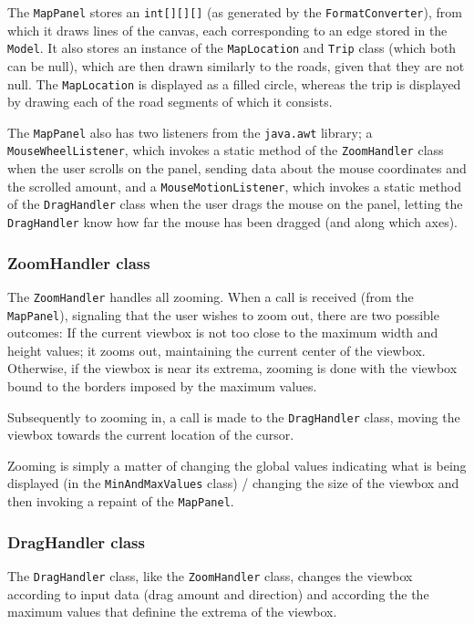 \documentclass[a4paper,11pt]{article}
\begin{document}
The \texttt{MapPanel} stores an \texttt{int[][][]} (as generated by the \texttt{FormatConverter}), from which it draws lines of the canvas, each corresponding to an edge stored in the \texttt{Model}. It also stores an instance of the \texttt{MapLocation} and \texttt{Trip} class (which both can be null), which are then drawn similarly to the roads, given that they are not null. The \texttt{MapLocation} is displayed as a filled circle, whereas the trip is displayed by drawing each of the road segments of which it consists.

The \texttt{MapPanel} also has two listeners from the \texttt{java.awt} library; a \\\texttt{MouseWheelListener}, which invokes a static method of the \texttt{ZoomHandler} class when the user scrolls on the panel, sending data about the mouse coordinates and the scrolled amount, and a \texttt{MouseMotionListener}, which invokes a static method of the \texttt{DragHandler} class when the user drags the mouse on the panel, letting the \texttt{DragHandler} know how far the mouse has been dragged (and along which axes).

\subsubsection{ZoomHandler class} %
The \texttt{ZoomHandler} handles all zooming. When a call is received (from the \texttt{MapPanel}), signaling that the user wishes to zoom out, there are two possible outcomes: If the current viewbox is not too close to the maximum width and height values; it zooms out, maintaining the current center of the viewbox. Otherwise, if the viewbox is near its extrema, zooming is done with the viewbox bound to the borders imposed by the maximum values.

Subsequently to zooming in, a call is made to the \texttt{DragHandler} class, moving the viewbox towards the current location of the cursor.

Zooming is simply a matter of changing the global values indicating what is being displayed (in the \texttt{MinAndMaxValues} class) / changing the size of the viewbox and then invoking a repaint of the \texttt{MapPanel}.

\subsubsection{DragHandler class} %
The \texttt{DragHandler} class, like the \texttt{ZoomHandler} class, changes the viewbox according to input data (drag amount and direction) and according the the maximum values that definine the extrema of the viewbox.
\end{document}
